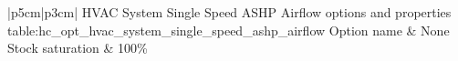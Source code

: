 \begin{customLongTable}{ |p{5cm}|p{3cm}| }
{HVAC System Single Speed ASHP Airflow options and properties} {table:hc_opt_hvac_system_single_speed_ashp_airflow}
{Option name & None}
\endhead
\hline
Stock saturation & 100\% \\ \hline
\end{customLongTable}
